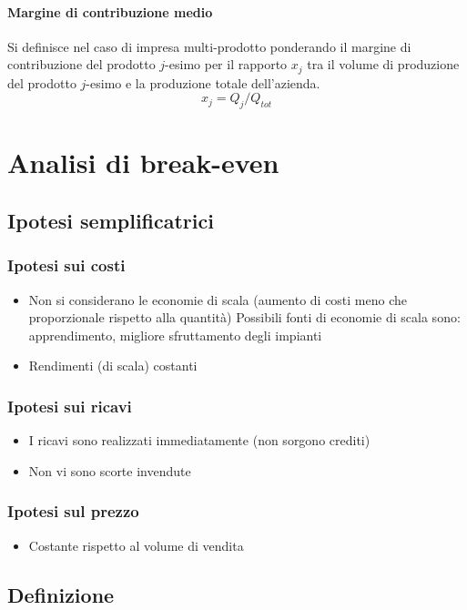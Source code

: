 \paragraph{Margine di contribuzione medio}
Si definisce nel caso di impresa multi-prodotto
ponderando il margine di contribuzione del prodotto $j$-esimo per il rapporto $x_j$ tra il
volume di produzione del prodotto $j$-esimo e la produzione totale dell’azienda.
\[
x_j = Q_j / Q_{tot}
\]

\section{Analisi di break-even}
\subsection{Ipotesi semplificatrici}

\subsubsection{Ipotesi sui costi}
\begin{itemize}
	\item Non si considerano le economie di scala (aumento di costi meno che
proporzionale rispetto alla quantità)
	Possibili fonti di economie di scala sono: apprendimento, migliore
sfruttamento degli impianti
	\item Rendimenti (di scala) costanti
\end{itemize}

\subsubsection{Ipotesi sui ricavi}
\begin{itemize}
	\item I ricavi sono realizzati immediatamente (non sorgono crediti)
	\item Non vi sono scorte invendute
\end{itemize}

\subsubsection{Ipotesi sul prezzo}
\begin{itemize}
	\item Costante rispetto al volume di vendita
\end{itemize}

\subsection{Definizione}

